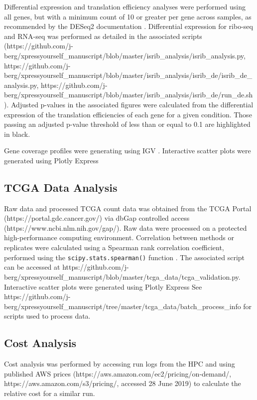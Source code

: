 \documentclass[11pt, a4paper, oneside]{article}
\begin{document}
Differential expression and translation efficiency analyses were performed using all genes, but with a minimum count of 10 or greater per gene across samples, as recommended by the DESeq2 documentation \cite{deseq2}. Differential expression for ribo-seq and RNA-seq was performed as detailed in the associated scripts (https://github.com/j-berg/xpressyourself\_manuscript/blob/master/isrib\_analysis/isrib\_analysis.py, https://github.com/j-berg/xpressyourself\_manuscript/blob/master/isrib\_analysis/isrib\_de/isrib\_de\_analysis.py, https://github.com/j-berg/xpressyourself\_manuscript/blob/master/isrib\_analysis/isrib\_de/run\_de.sh). Adjusted p-values in the associated figures were calculated from the differential expression of the translation efficiencies of each gene for a given condition. Those passing an adjusted p-value threshold of less than or equal to 0.1 are highlighted in black. \par

Gene coverage profiles were generating using IGV \cite{igv}. Interactive scatter plots were generated using Plotly Express \cite{plotly} \par

\subsection{TCGA Data Analysis}
Raw data and processed TCGA count data was obtained from the TCGA Portal (https://portal.gdc.cancer.gov/) via dbGap controlled access (https://www.ncbi.nlm.nih.gov/gap/). Raw data were processed on a protected high-performance computing environment. Correlation between methods or replicates were calculated using a Spearman rank correlation coefficient, performed using the \texttt{scipy.stats.spearman()} function \cite{spearman_rnaseq}. The associated script can be accessed at https://github.com/j-berg/xpressyourself\_manuscript/blob/master/tcga\_data/tcga\_validation.py. Interactive scatter plots were generated using Plotly Express \cite{plotly} See https://github.com/j-berg/xpressyourself\_manuscript/tree/master/tcga\_data/batch\_process\_info for scripts used to process data. \par


\subsection{Cost Analysis}
Cost analysis was performed by accessing run logs from the HPC and using published AWS prices (https://aws.amazon.com/ec2/pricing/on-demand/, https://aws.amazon.com/s3/pricing/, accessed 28 June 2019) to calculate the relative cost for a similar run.
\end{document}
